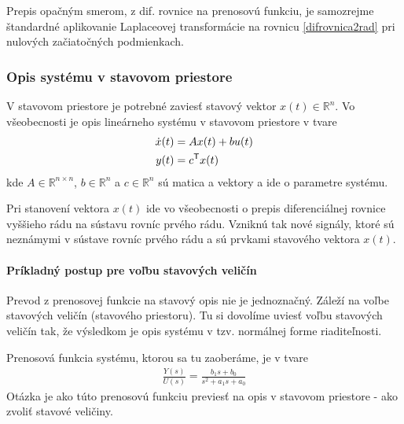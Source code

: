 \documentclass[a4paper, 10pt, ]{article}
\begin{document}
Prepis opačným smerom, z dif. rovnice na prenosovú funkciu, je samozrejme štandardné aplikovanie Laplaceovej transformácie na rovnicu \eqref{difrovnica2rad} pri nulových začiatočných podmienkach.







\subsubsection{Opis systému v stavovom priestore}

V stavovom priestore je potrebné zaviesť stavový vektor $x(t) \in \mathbb R^n$. Vo všeobecnosti je opis lineárneho systému v stavovom priestore v tvare
\begin{subequations}
\begin{align}
    \dot x(t) &= A x(t) + b u(t) \\
    y(t) &= c^{\mathsf{T}} x(t) 
\end{align}
\end{subequations}
kde $A \in \mathbb R^{n \times n}$, $b \in \mathbb R^n$ a $c \in \mathbb R^n$ sú matica a vektory a ide o parametre systému.

Pri stanovení vektora $x(t)$ ide vo všeobecnosti o prepis diferenciálnej rovnice vyššieho rádu na sústavu rovníc prvého rádu. Vzniknú tak nové signály, ktoré sú neznámymi v sústave rovníc prvého rádu a sú prvkami stavového vektora $x(t)$.



\paragraph{Príkladný postup pre voľbu stavových veličín}

Prevod z prenosovej funkcie na stavový opis nie je jednoznačný. Záleží na voľbe stavových veličín (stavového priestoru). Tu si dovolíme uviesť voľbu stavových veličín tak, že výsledkom je opis systému v tzv. normálnej forme riaditeľnosti.

Prenosová funkcia systému, ktorou sa tu zaoberáme, je v tvare
\begin{align} \label{tfVseob01}
	\frac{Y(s)}{U(s)} = \frac{b_1 s + b_0}{ s^2 + a_1 s + a_0}
\end{align}
Otázka je ako túto prenosovú funkciu previesť na opis v stavovom priestore - ako zvoliť stavové veličiny.
\end{document}

